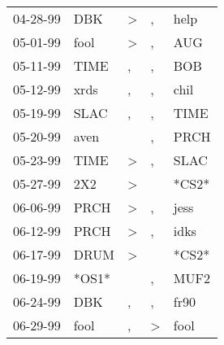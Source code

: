 \begin{supertabular}{p{0.07\textwidth}p{0.06\textwidth}p{0.02\textwidth}p{0.02\textwidth}p{0.06\textwidth}}
          04-28-99\textsuperscript{} &            DBK\textsuperscript{} &  \textgreater &             , &          help\textsuperscript{} \\
          05-01-99\textsuperscript{} &           fool\textsuperscript{} &  \textgreater &             , &           AUG\textsuperscript{} \\
          05-11-99\textsuperscript{} &           TIME\textsuperscript{} &             , &             , &           BOB\textsuperscript{} \\
          05-12-99\textsuperscript{} &           xrds\textsuperscript{} &             , &             , &          chil\textsuperscript{} \\
          05-19-99\textsuperscript{} &           SLAC\textsuperscript{} &             , &             , &          TIME\textsuperscript{} \\
          05-20-99\textsuperscript{} &           aven\textsuperscript{} &               &             , &          PRCH\textsuperscript{} \\
          05-23-99\textsuperscript{} &           TIME\textsuperscript{} &  \textgreater &             , &          SLAC\textsuperscript{} \\
          05-27-99\textsuperscript{} &            2X2\textsuperscript{} &  \textgreater &               &                           *CS2* \\
          06-06-99\textsuperscript{} &           PRCH\textsuperscript{} &  \textgreater &             , &          jess\textsuperscript{} \\
          06-12-99\textsuperscript{} &           PRCH\textsuperscript{} &  \textgreater &             , &          idks\textsuperscript{} \\
          06-17-99\textsuperscript{} &           DRUM\textsuperscript{} &  \textgreater &               &                           *CS2* \\
          06-19-99\textsuperscript{} &                            *OS1* &               &             , &          MUF2\textsuperscript{} \\
          06-24-99\textsuperscript{} &            DBK\textsuperscript{} &             , &             , &          fr90\textsuperscript{} \\
          06-29-99\textsuperscript{} &           fool\textsuperscript{} &             , &  \textgreater &          fool\textsuperscript{} \\

\end{supertabular}
